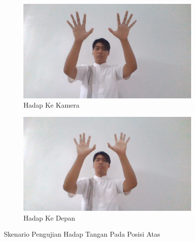 \begin{enumerate}
  \begin{figure}[H]
    \centering
    \begin{subfigure}{0.7\textwidth}
      \centering
      \includegraphics[width=\linewidth]{../Gambar/AtasHadapKamera.jpg}
      \caption{Hadap Ke Kamera}
      \label{fig:atashadapkamera}
    \end{subfigure}
    \begin{subfigure}{0.7\textwidth}
      \centering
      \includegraphics[width=\linewidth]{../Gambar/AtasHadapLurus.jpg}
      \caption{Hadap Ke Depan}
      \label{fig:atashadapkamera}
    \end{subfigure}
    \centering
    \caption{Skenario Pengujian Hadap Tangan Pada Posisi Atas}
    \label{fig:posisiatas}
  \end{figure}


\end{enumerate}

